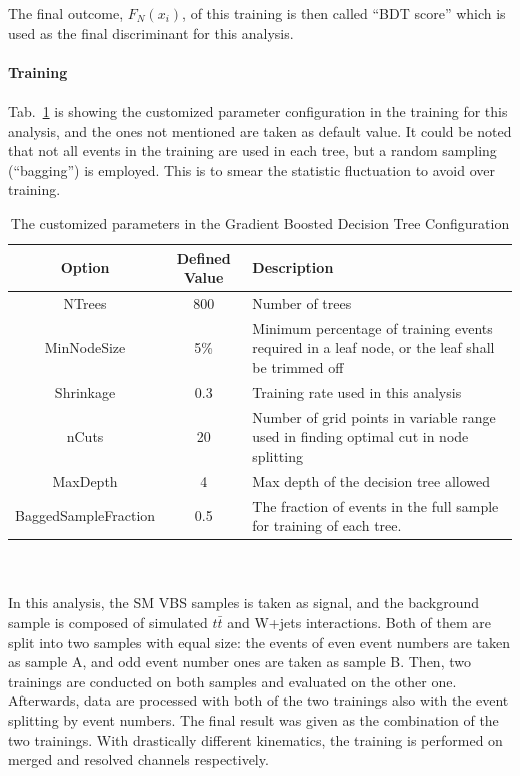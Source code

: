 The final outcome, $F_N(x_{i})$, of this training is then called ``BDT score'' which is used as the final discriminant for this analysis. 
\\
\\{\bf Training}
\\
\\Tab.~\ref{Tab:BDTG_config} is showing the customized parameter configuration in the training for this analysis, and the ones not mentioned are taken as default value. It could be noted that not all events in the training are used in each tree, but a random sampling (``bagging'') is employed. This is to smear the statistic fluctuation to avoid over training.
\begin{table}[t]
	\caption{The customized parameters in the Gradient Boosted Decision Tree Configuration } \label{Tab:BDTG_config}
	\begin{center}
			\begin{tabularx}{\textwidth}{|c|c|X|}
				\hline
				Option & Defined Value & Description \\
				\hline
				NTrees & 800 & Number of trees\\
				\hline
                MinNodeSize & 5\% & Minimum percentage of training events required in a leaf node, or the leaf shall be trimmed off \\
                \hline
                Shrinkage & 0.3 & Training rate used in this analysis \\
				\hline
                nCuts & 20 & Number of grid points in variable range used in finding optimal cut in node splitting\\
				\hline
				MaxDepth & 4 & Max depth of the decision tree allowed \\
				\hline 
				BaggedSampleFraction & 0.5 & The fraction of events in the full sample for training of each tree. \\
				\hline
			\end{tabularx}
	\end{center}
\end{table}
\noindent
\\
\\In this analysis, the SM VBS samples is taken as signal, and the background sample is composed of simulated $t\bar{t}$ and W+jets interactions. Both of them are split into two samples with equal size: the events of even event numbers are taken as sample A, and odd event number ones are taken as sample B. Then, two trainings are conducted on both samples and evaluated on the other one. Afterwards, data are processed with both of the two trainings also with the event splitting by event numbers. The final result was given as the combination of the two trainings. With drastically different kinematics, the training is performed on merged and resolved channels respectively. 
